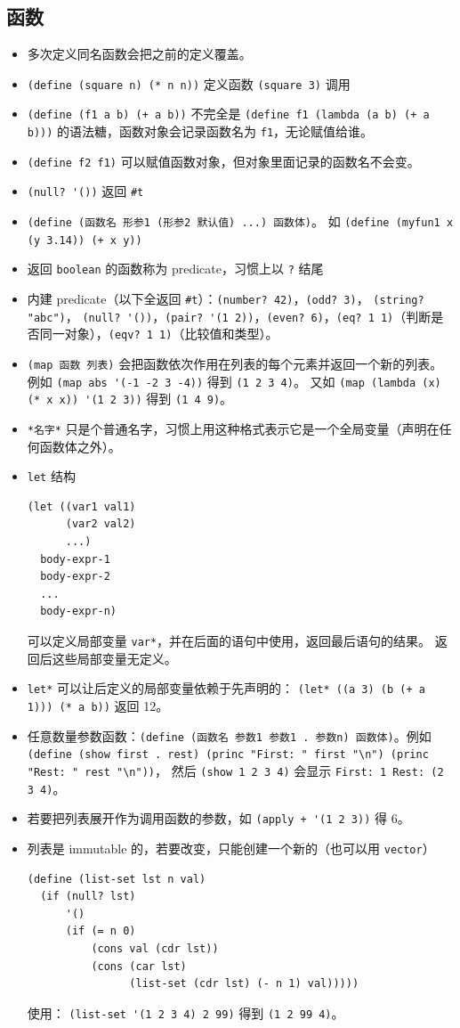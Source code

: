 \subsection{函数}
\begin{itemize}
\item 多次定义同名函数会把之前的定义覆盖。
\item \verb`(define (square n) (* n n))` 定义函数 \verb`(square 3)` 调用
\item \verb`(define (f1 a b) (+ a b))` 不完全是 \verb`(define f1 (lambda (a b) (+ a b)))` 的语法糖，函数对象会记录函数名为 \verb`f1`，无论赋值给谁。
\item \verb`(define f2 f1)` 可以赋值函数对象，但对象里面记录的函数名不会变。
\item \verb`(null? '())` 返回 \verb`#t`
\item \verb`(define (函数名 形参1 (形参2 默认值) ...) 函数体)`。 如 \verb`(define (myfun1 x (y 3.14)) (+ x y))`
\item 返回 \verb`boolean` 的函数称为 predicate，习惯上以 \verb`?` 结尾
\item 内建 predicate（以下全返回 \verb`#t`）：\verb`(number? 42)`，\verb`(odd? 3)`， \verb`(string? "abc")`， \verb`(null? '())`，\verb`(pair? '(1 2))`，\verb`(even? 6)`，\verb`(eq? 1 1)`（判断是否同一对象），\verb`(eqv? 1 1)`（比较值和类型）。
\item \verb`(map 函数 列表)` 会把函数依次作用在列表的每个元素并返回一个新的列表。 例如 \verb`(map abs '(-1 -2 3 -4))` 得到 \verb`(1 2 3 4)`。 又如 \verb`(map (lambda (x) (* x x)) '(1 2 3))` 得到 \verb`(1 4 9)`。
\item \verb`*名字*` 只是个普通名字，习惯上用这种格式表示它是一个全局变量（声明在任何函数体之外）。
\item \verb`let` 结构
\begin{lstlisting}[language=none]
(let ((var1 val1)
      (var2 val2)
      ...)
  body-expr-1
  body-expr-2
  ...
  body-expr-n)
\end{lstlisting}
可以定义局部变量 \verb`var*`，并在后面的语句中使用，返回最后语句的结果。 返回后这些局部变量无定义。
\item \verb`let*` 可以让后定义的局部变量依赖于先声明的： \verb`(let* ((a 3) (b (+ a 1))) (* a b))` 返回 12。
\item 任意数量参数函数：\verb`(define (函数名 参数1 参数1 . 参数n) 函数体)`。例如 \verb`(define (show first . rest) (princ "First: " first "\n") (princ "Rest: " rest "\n"))`， 然后 \verb`(show 1 2 3 4)` 会显示 \verb`First: 1 Rest: (2 3 4)`。
\item 若要把列表展开作为调用函数的参数，如 \verb`(apply + '(1 2 3))` 得 6。
\item 列表是 immutable 的，若要改变，只能创建一个新的（也可以用 \verb`vector`）
\begin{lstlisting}[language=none]
(define (list-set lst n val)
  (if (null? lst)
      '()
      (if (= n 0)
          (cons val (cdr lst))
          (cons (car lst)
                (list-set (cdr lst) (- n 1) val)))))
\end{lstlisting}
使用： \verb`(list-set '(1 2 3 4) 2 99)` 得到 \verb`(1 2 99 4)`。
\end{itemize}

